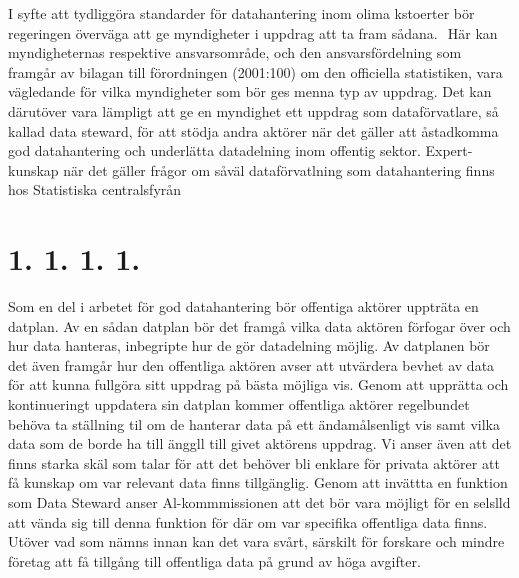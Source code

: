 {{{{{{{{{

I syfte att tydliggöra standarder för datahantering inom olima kstoerter bör regeringen överväga att ge myndigheter i uppdrag att ta fram sådana. \({ }^{}\) Här kan myndigheternas respektive ansvarsområde, och den ansvarsfördelning som framgår av bilagan till förordningen (2001:100) om den officiella statistiken, vara vägledande för vilka myndigheter som bör ges menna typ av uppdrag. Det kan därutöver vara lämpligt att ge en myndighet ett uppdrag som dataförvatlare, så kallad data steward, för att stödja andra aktörer när det gäller att åstadkomma god datahantering och underlätta datadelning inom offentig sektor. Expert- kunskap när det gäller frågor om såväl dataförvatlning som datahantering finns hos Statistiska centralsfyrån
\section*{1. 1. 1. 1.}
Som en del i arbetet för god datahantering bör offentiga aktörer uppträta en datplan. Av en sådan datplan bör det framgå vilka data aktören förfogar över och hur data hanteras, inbegripte hur de gör datadelning möjlig. Av datplanen bör det även framgår hur den offentliga aktören avser att utvärdera bevhet av data för att kunna fullgöra sitt uppdrag på bästa möjliga vis. Genom att upprätta och kontinueringt uppdatera sin datplan kommer offentliga aktörer regelbundet behöva ta ställning til om de hanterar data på ett ändamålsenligt vis samt vilka data som de borde ha till änggll till givet aktörens uppdrag.
Vi anser även att det finns starka skäl som talar för att det behöver bli enklare för privata aktörer att få kunskap om var relevant data finns tillgänglig. Genom att invättta en funktion som Data Steward anser Al-kommmissionen att det bör vara möjligt för en selslld att vända sig till denna funktion för där om var specifika offentliga data finns. Utöver vad som nämns innan kan det vara svårt, särskilt för forskare och mindre företag att få tillgång till offentliga data på grund av höga avgifter.
}}}}}}}}}
